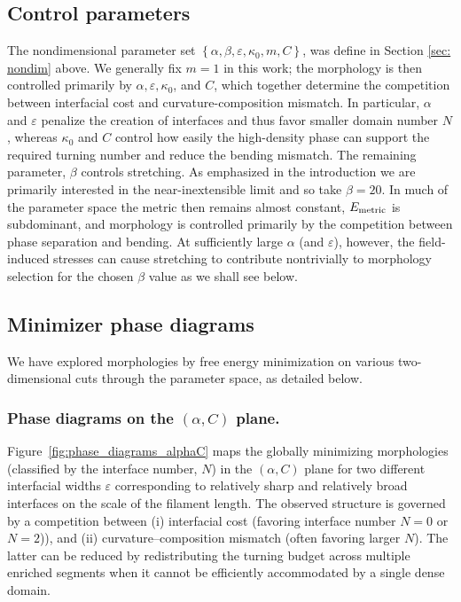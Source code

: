 \documentclass[
aip,
jcp,
reprint, 
floatfix
]{revtex4-1}
\begin{document}
\subsection{Control parameters }
The nondimensional parameter set $\left\{\alpha, \beta, \varepsilon, \kappa_0, m, C\right\}$, was define in Section \ref{sec: nondim} above. We generally fix $m=1$ in this work; the morphology is then controlled primarily by  $\alpha, \varepsilon, \kappa_0$, and $C$, which together determine the competition between interfacial cost and curvature-composition mismatch. In particular, $\alpha$ and $\varepsilon$ penalize the creation of interfaces and thus favor smaller domain number $N$, whereas $\kappa_0$ and $C$ control how easily the high-density phase can support the required turning number and reduce the bending mismatch. The remaining parameter, $\beta$ controls stretching. As emphasized in the introduction we are primarily interested in the near-inextensible limit and so take $\beta=20$.
In much of the parameter space the metric then remains almost constant, 
$E_{\rm metric}$ is subdominant, and morphology is controlled primarily by the  competition between phase separation and bending.
At sufficiently large $\alpha$ (and $\varepsilon$), however, the field-induced stresses can cause
stretching to contribute nontrivially to morphology selection for the chosen $\beta$ value as we shall see below. 

\subsection{Minimizer phase diagrams} \label{sec: phase_diagram}
We have explored morphologies by free energy minimization on various two-dimensional cuts through the parameter space, as detailed below.

\subsubsection{Phase diagrams on the \texorpdfstring{$(\alpha, C)$}{(alpha, C)} plane.}
Figure~\ref{fig:phase_diagrams_alphaC} maps the globally minimizing morphologies (classified by the interface number, $N$) in the $(\alpha,C)$ plane for two different interfacial widths $\varepsilon$  corresponding to relatively sharp and relatively broad interfaces on the scale of the filament length. The observed structure is governed by a competition between (i) interfacial cost (favoring interface number $N=0$ or $N=2$)), and (ii) curvature--composition mismatch (often favoring larger $N$). The latter can be reduced by redistributing the turning budget across multiple enriched segments when it cannot be efficiently accommodated by a single dense domain. 
\end{document}
